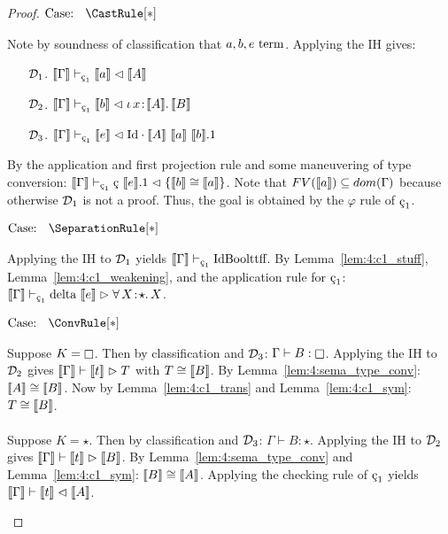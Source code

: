 \begin{proof}
    $\text{Case: }\begin{array}{c} \CastRule[*] \end{array}$
    \begin{proofcase}
        Note by soundness of classification that $a, b, e~\textnormal{term}$.
        Applying the IH gives:
        \begin{enumerate}
            \item[$\mathcal{D}_{1}$.] $\sema{\Gamma} \vdash_{\oldced} \sema{a} \chck \sema{A}$
            \item[$\mathcal{D}_{2}$.] $\sema{\Gamma} \vdash_{\oldced} \sema{b} \chck \abs{\iota}{x}{\sema{A}}{\sema{B}}$
            \item[$\mathcal{D}_{3}$.] $\sema{\Gamma} \vdash_{\oldced} \sema{e} \chck \cId \cdot \sema{A}\ \sema{a}\ \sema{b}.1$
        \end{enumerate}
        By the application and first projection rule and some maneuvering of type conversion: $\sema{\Gamma} \vdash_{\oldced} \text{\c{c}}\ \sema{e}.1 \chck \{ \sema{b} \cong \sema{a}\}$.
        Note that $FV(\llbracket a \rrbracket) \subseteq dom(\Gamma)$ because otherwise $\mathcal{D}_{1}$ is not a proof.
        Thus, the goal is obtained by the $\varphi$ rule of $\oldced$.
    \end{proofcase}

    $\text{Case: }\begin{array}{c} \SeparationRule[*] \end{array}$
    \begin{proofcase}
        Applying the IH to $\mathcal{D}_{1}$ yields $\sema{\Gamma} \vdash_{\oldced} \cId \cBool \ctt \cff$.
        By Lemma~\ref{lem:4:c1_stuff}, Lemma~\ref{lem:4:c1_weakening}, and the application rule for $\oldced$:
            $\sema{\Gamma} \vdash_{\oldced} \cdelta\ \sema{e} \infr \abs{\forall}{X}{\star}{X}$.
    \end{proofcase}

    $\text{Case: }\begin{array}{c} \ConvRule[*] \end{array}$
    \begin{proofcase}
        Suppose $K = \kind$.
        Then by classification and $\mathcal{D}_{3}$: $\Gamma \vdash B : \kind$.
        Applying the IH to $\mathcal{D}_{2}$ gives $\llbracket \Gamma \rrbracket \vdash \llbracket t \rrbracket \vartriangleright T$ with $T \cong \llbracket B \rrbracket$.
        By Lemma~\ref{lem:4:sema_type_conv}: $\llbracket A \rrbracket \cong \llbracket B \rrbracket$.
        Now by Lemma~\ref{lem:4:c1_trans} and Lemma~\ref{lem:4:c1_sym}: $T \cong \llbracket B \rrbracket$.
        \\ \\
        Suppose $K = \star$.
        Then by classification and $\mathcal{D}_{3}$: $\Gamma \vdash B : \star$.
        Applying the IH to $\mathcal{D}_{2}$ gives $\llbracket \Gamma \rrbracket \vdash \llbracket t \rrbracket \vartriangleright \llbracket B \rrbracket$.
        By Lemma~\ref{lem:4:sema_type_conv} and Lemma~\ref{lem:4:c1_sym}: $\llbracket B \rrbracket \cong \llbracket A \rrbracket$.
        Applying the checking rule of $\oldced$ yields $\llbracket \Gamma \rrbracket \vdash \llbracket t \rrbracket \vartriangleleft \llbracket A \rrbracket$.
    \end{proofcase}
\end{proof}

